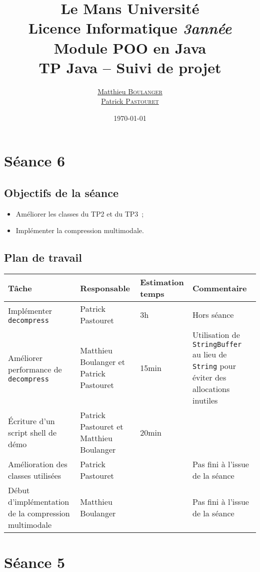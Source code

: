 \documentclass[a4paper,11pt]{article}
\title {\textbf {\color {blue} Le Mans Université}\color{black}
\\  Licence Informatique  \textit {3\ieme année}
 \\Module POO en Java
 \\ \textbf {TP Java – Suivi de projet}}
\author{\href{mailto: matthieu.boulanger.etu@univ-lemans.fr} {Matthieu \textsc{Boulanger}}\\
      \href{mailto: patrick.pastouret.etu@univ-lemans.fr} {Patrick \textsc{Pastouret}}}
\date{\today}
\begin{document}
\maketitle

\section{Séance 6}

\subsection{Objectifs de la séance}
\begin{itemize}
  \item Améliorer les classes du TP2 et du TP3~;
  \item Implémenter la compression multimodale.
\end{itemize}

\subsection{Plan de travail}
\begin{center}
    \begin{tabular}{p{.3\linewidth}p{.3\linewidth}p{.3\linewidth}p{.3\linewidth}}
      \toprule
	Tâche & Responsable & Estimation temps & Commentaire \\
      \midrule
      Implémenter \texttt{decompress} & Patrick Pastouret & 3h & Hors séance \\
      Améliorer performance de \texttt{decompress} & Matthieu Boulanger et Patrick Pastouret & 15min & Utilisation de \texttt{StringBuffer} au lieu de \texttt{String} pour éviter des allocations inutiles \\
      Écriture d’un script shell de démo & Patrick Pastouret et Matthieu Boulanger & 20min & \\
      Amélioration des classes utilisées & Patrick Pastouret &  & Pas fini à l’issue de la séance \\
      Début d’implémentation de la compression multimodale & Matthieu Boulanger &  & Pas fini à l’issue de la séance \\
      \bottomrule
   \end{tabular}
\end{center}

\section{Séance 5}
\end{document}
